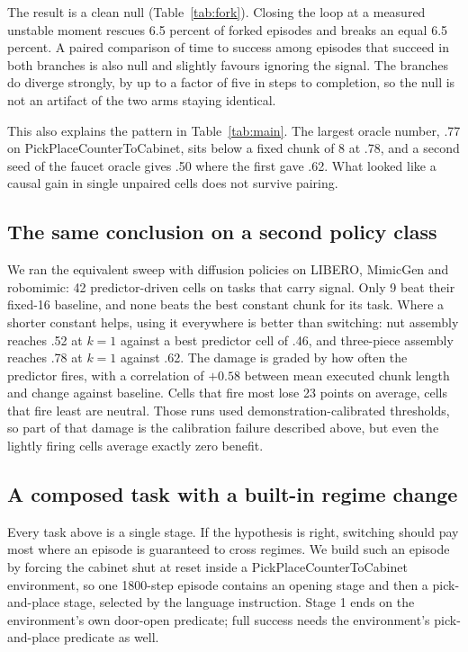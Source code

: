 The result is a clean null (Table~\ref{tab:fork}). Closing the loop at a
measured unstable moment rescues 6.5 percent of forked episodes and breaks an
equal 6.5 percent. A paired comparison of time to success among episodes that
succeed in both branches is also null and slightly favours ignoring the signal.
The branches do diverge strongly, by up to a factor of five in steps to
completion, so the null is not an artifact of the two arms staying identical.

This also explains the pattern in Table~\ref{tab:main}. The largest oracle
number, .77 on PickPlaceCounterToCabinet, sits below a fixed chunk of 8 at .78,
and a second seed of the faucet oracle gives .50 where the first gave .62. What
looked like a causal gain in single unpaired cells does not survive pairing.

\subsection{The same conclusion on a second policy class}

We ran the equivalent sweep with diffusion policies on LIBERO, MimicGen and
robomimic: 42 predictor-driven cells on tasks that carry signal. Only 9 beat
their fixed-16 baseline, and none beats the best constant chunk for its task.
Where a shorter constant helps, using it everywhere is better than switching:
nut assembly reaches .52 at $k{=}1$ against a best predictor cell of .46, and
three-piece assembly reaches .78 at $k{=}1$ against .62. The damage is
graded by how often the predictor fires, with a correlation of $+0.58$ between
mean executed chunk length and change against baseline. Cells that fire most
lose 23 points on average, cells that fire least are neutral. Those runs used
demonstration-calibrated thresholds, so part of that damage is the calibration
failure described above, but even the lightly firing cells average exactly
zero benefit.

\subsection{A composed task with a built-in regime change}

Every task above is a single stage. If the hypothesis is right, switching
should pay most where an episode is guaranteed to cross regimes. We build such
an episode by forcing the cabinet shut at reset inside a
PickPlaceCounterToCabinet environment, so one 1800-step episode contains an
opening stage and then a pick-and-place stage, selected by the language
instruction. Stage 1 ends on the environment's own door-open predicate; full
success needs the environment's pick-and-place predicate as well.

